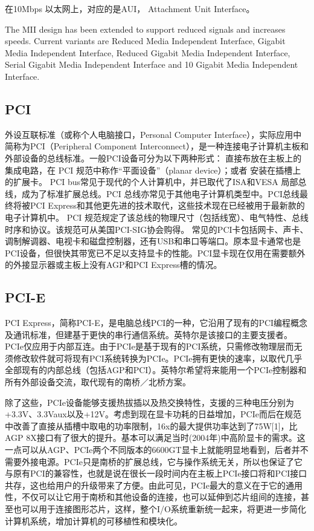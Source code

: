 在10Mbps 以太网上，对应的是AUI， Attachment Unit Interface。

The MII design has been extended to support reduced signals and increases speeds. Current variants are Reduced Media Independent Interface, Gigabit Media Independent Interface, Reduced Gigabit Media Independent Interface, Serial Gigabit Media Independent Interface and 10 Gigabit Media Independent Interface.

\subsection{PCI}
外设互联标准（或称个人电脑接口，Personal Computer Interface），实际应用中简称为PCI（Peripheral Component Interconnect），是一种连接电子计算机主板和外部设备的总线标准。一般PCI设备可分为以下两种形式：
直接布放在主板上的集成电路，在 PCI 规范中称作“平面设备”（planar device）；或者
安装在插槽上的扩展卡。
PCI bus常见于现代的个人计算机中，并已取代了ISA和VESA 局部总线，成为了标准扩展总线。PCI 总线亦常见于其他电子计算机类型中。PCI总线最终将被PCI Express和其他更先进的技术取代，这些技术现在已经被用于最新款的电子计算机中。
PCI 规范规定了该总线的物理尺寸（包括线宽）、电气特性、总线时序和协议。该规范可从美国PCI-SIG协会购得。
常见的PCI卡包括网卡、声卡、调制解调器、电视卡和磁盘控制器，还有USB和串口等端口。原本显卡通常也是PCI设备，但很快其带宽已不足以支持显卡的性能。PCI显卡现在仅用在需要额外的外接显示器或主板上没有AGP和PCI Express槽的情况。

\subsection{PCI-E}
PCI Express，简称PCI-E，是电脑总线PCI的一种，它沿用了现有的PCI编程概念及通讯标准，但建基于更快的串行通信系统。英特尔是该接口的主要支援者。PCIe仅应用于内部互连。由于PCIe是基于现有的PCI系统，只需修改物理层而无须修改软件就可将现有PCI系统转换为PCIe。PCIe拥有更快的速率，以取代几乎全部现有的内部总线（包括AGP和PCI）。英特尔希望将来能用一个PCIe控制器和所有外部设备交流，取代现有的南桥／北桥方案。

除了这些，PCIe设备能够支援热拔插以及热交换特性，支援的三种电压分别为+3.3V、3.3Vaux以及+12V。考虑到现在显卡功耗的日益增加，PCIe而后在规范中改善了直接从插槽中取电的功率限制，16x的最大提供功率达到了75W[1]，比AGP 8X接口有了很大的提升。基本可以满足当时(2004年)中高阶显卡的需求。这一点可以从AGP、PCIe两个不同版本的6600GT显卡上就能明显地看到，后者并不需要外接电源。PCIe只是南桥的扩展总线，它与操作系统无关，所以也保证了它与原有PCI的兼容性，也就是说在很长一段时间内在主板上PCIe接口将和PCI接口共存，这也给用户的升级带来了方便。由此可见，PCIe最大的意义在于它的通用性，不仅可以让它用于南桥和其他设备的连接，也可以延伸到芯片组间的连接，甚至也可以用于连接图形芯片，这样，整个I/O系统重新统一起来，将更进一步简化计算机系统，增加计算机的可移植性和模块化。


